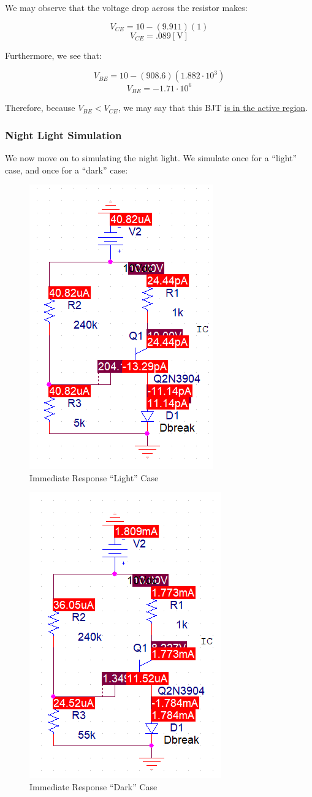 \documentclass[
	letterpaper, %
	10pt, %
]{CSUniSchoolLabReport}
\begin{document}
We may observe that the voltage drop across the resistor makes:

$$V_{CE}=10-(9.911)(1)$$
$$V_{CE}=.089[\si{\volt}]$$

Furthermore, we see that: 

$$V_{BE}= 10-(908.6)(1.882\cdot10^3)$$
$$V_{BE}= -1.71\cdot10^{6}$$

Therefore, because $V_{BE}<V_{CE}$, we may say that this BJT \underline{is in the active region}.

\subsubsection{Night Light Simulation}

We now move on to simulating the night light. We simulate once for a ``light'' case, and once for a ``dark'' case:

\begin{figure}[H]
  \centering
  \includegraphics[width=.4\textwidth]{Figures/L3F7}
  \caption{Immediate Response ``Light'' Case}
  \label{fig:11}
\end{figure}

\begin{figure}[H]
  \centering
  \includegraphics[width=.4\textwidth]{Figures/L3F8}
  \caption{Immediate Response ``Dark'' Case}
  \label{fig:12}
\end{figure}
\end{document}
